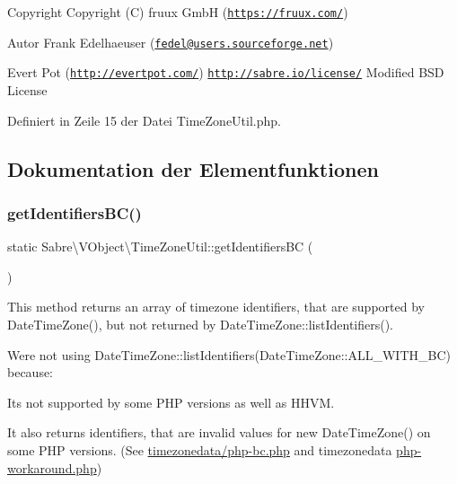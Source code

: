\begin{DoxyCopyright}{Copyright}
Copyright (C) fruux GmbH (\href{https://fruux.com/}{\tt https\+://fruux.\+com/}) 
\end{DoxyCopyright}
\begin{DoxyAuthor}{Autor}
Frank Edelhaeuser (\href{mailto:fedel@users.sourceforge.net}{\tt fedel@users.\+sourceforge.\+net}) 

Evert Pot (\href{http://evertpot.com/}{\tt http\+://evertpot.\+com/})  \href{http://sabre.io/license/}{\tt http\+://sabre.\+io/license/} Modified B\+SD License 
\end{DoxyAuthor}


Definiert in Zeile 15 der Datei Time\+Zone\+Util.\+php.



\subsection{Dokumentation der Elementfunktionen}
\mbox{\label{class_sabre_1_1_v_object_1_1_time_zone_util_a81310986f7bd1b2db4b431aef6d0bc73}} 
\subsubsection{\texorpdfstring{get\+Identifiers\+B\+C()}{getIdentifiersBC()}}
{\footnotesize\ttfamily static Sabre\textbackslash{}\+V\+Object\textbackslash{}\+Time\+Zone\+Util\+::get\+Identifiers\+BC (\begin{DoxyParamCaption}{ }\end{DoxyParamCaption})\hspace{0.3cm}{\ttfamily [static]}}

This method returns an array of timezone identifiers, that are supported by Date\+Time\+Zone(), but not returned by Date\+Time\+Zone\+::list\+Identifiers().

We\textquotesingle{}re not using Date\+Time\+Zone\+::list\+Identifiers(\+Date\+Time\+Zone\+::\+A\+L\+L\+\_\+\+W\+I\+T\+H\+\_\+\+B\+C) because\+:
\begin{DoxyItemize}
\item It\textquotesingle{}s not supported by some P\+HP versions as well as H\+H\+VM.
\item It also returns identifiers, that are invalid values for new Date\+Time\+Zone() on some P\+HP versions. (See \mbox{\hyperlink{php-bc_8php_source}{timezonedata/php-\/bc.\+php}} and timezonedata \mbox{\hyperlink{php-workaround_8php_source}{php-\/workaround.\+php}})
\end{DoxyItemize}

